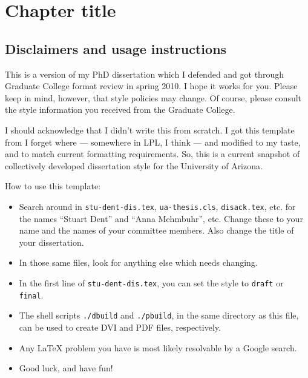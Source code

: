 \chapter{Chapter title}
\label{chap:one_chapter}

\section{Disclaimers and usage instructions}

This is a version of my PhD dissertation which I defended and got through
Graduate College format review in spring 2010.  I hope it works for you.
Please keep in mind, however, that style policies may change.  Of course,
please consult the style information you received from the Graduate College.

I should acknowledge that I didn't write this from scratch.  I got this
template from I forget where --- somewhere in LPL, I think --- and modified to
my taste, and to match current formatting requirements.  So, this is a current
snapshot of collectively developed dissertation style for the University
of Arizona.

How to use this template:

\begin{itemize}

\item Search around in
\texttt{stu-dent-dis.tex},
\texttt{ua-thesis.cls},
\texttt{disack.tex}, etc. for the names ``Stuart Dent'' and
``Anna Mehmbuhr'', etc.  Change these to your name and the names of your
committee members.  Also change the title of your dissertation.

\item In those same files, look for anything else which needs changing.

\item In the first line of \texttt{stu-dent-dis.tex}, you can set the style to
\texttt{draft} or \texttt{final}.

\item The shell scripts \texttt{./dbuild} and \texttt{./pbuild}, in the
same directory as this file, can be used to create DVI and PDF files,
respectively.

\item Any {\LaTeX} problem you have is most likely resolvable by a Google
search.

\item Good luck, and have fun!

\end{itemize}

